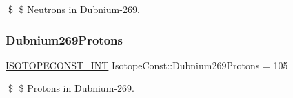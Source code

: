\$ \$ Neutrons in Dubnium-\/269. \mbox{\label{group___isotope_const-_dubnium-_db269_ga8fef3b0450136d0c650baebd3ac97f0e}} 
\subsubsection{\texorpdfstring{Dubnium269\+Protons}{Dubnium269Protons}}
{\footnotesize\ttfamily \mbox{\hyperlink{group___isotope_const-_macros_ga5f18360b3e99483a35c32d789e62621c}{I\+S\+O\+T\+O\+P\+E\+C\+O\+N\+S\+T\+\_\+\+I\+NT}} Isotope\+Const\+::\+Dubnium269\+Protons = 105}

\$ \$ Protons in Dubnium-\/269. 